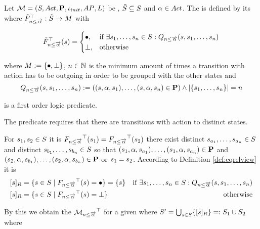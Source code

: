 \documentclass[preview]{standalone}
\begin{document}
\begin{definition}	
	Let ${{{\mathcal{M}}}} = {{({S}, {Act}, {\textbf{P}}, {\iota_{init}}, {AP}, {L})}}$ be \achgphN, ${\tilde{{S}}} \subseteq {S}$ and ${\alpha} \in {Act}$. The \viewN \viewminoutaction is defined by its \grpfctN \gfctminoutaction where ${{\tilde{F}_{{{n}\leq{\overrightarrow{\ensuremath{{\alpha}}}}}}}^{\top}} : {\tilde{{S}}} \to {\ensuremath{{M}}}$ with

	\[
	{{\tilde{F}_{{{n}\leq{\overrightarrow{\ensuremath{{\alpha}}}}}}}^{\top}}({s}) =
	\begin{cases}
			{\bullet},				& \text{if } \exists {s}_1, \dots, {s}_{n} \in {S}:  {Q_{{n}\leq{\overrightarrow{\ensuremath{{\alpha}}}}}({s},{s}_1, \dots, {s}_{{n}})}\\
			{\bot},          	& \text{otherwise}
		\end{cases}
	\]
	
	where ${{M}} := {\{{\bullet}, {\bot}\}}$,
	 ${n} \in {\mathbb{N}}$ is the minimum amount of times a transition with action \action has to be outgoing in order to be grouped with the other states and
	\[
	{Q_{{n}\leq{\overrightarrow{\ensuremath{{\alpha}}}}}({s},{s}_1, \dots, {s}_{{n}})} := (({s}, {\alpha}, {s}_1), \dots, ({s}, {\alpha}, {s}_{n}) \in {\ensuremath{{\textbf{P}}}}) \land |\{{s}_1, \dots, {s}_{n}\}| = {n}
	\]
	
	is a first order logic predicate.
	\label{def:minoutaction}
\end{definition}

The predicate \predminoutact requires that there are transitions with action \action to \numoutact distinct states.

For ${s}_1,{s}_2 \in {S}$ it is ${{F_{{{n}\leq{\overrightarrow{\ensuremath{{\alpha}}}}}}}^{\top}}({s}_1) = {{F_{{{n}\leq{\overrightarrow{\ensuremath{{\alpha}}}}}}}^{\top}}({s}_2)$ \iffN there exist distinct ${s}_{a_1}, \dots, {s}_{a_{n}} \in {S}$ and distinct ${s}_{b_1}, \dots, {s}_{b_{n}} \in {S}$ so that $({s}_1, {\alpha}, {s}_{a_1}), \dots, ({s}_1, {\alpha}, {s}_{a_{n}}) \in {\ensuremath{{\textbf{P}}}}$ and $({s}_2, {\alpha}, {s}_{b_1}), \dots, ({s}_2, {\alpha}, {s}_{b_{n}}) \in {\ensuremath{{\textbf{P}}}}$ or ${s}_1 = {s}_2$. According to Definition \ref{def:eqrelview} it is 
\begin{align*}
	\eqclassv &= \{\state \in \states \mid \gfctminoutaction(\state) = \remelem\} = \{\state\} &\text{if } \exists \state_1, \dots, \state_\numoutact \in \states:  \predminoutact \\ 
	\eqclassv &= \{\state \in \states \mid \gfctminoutaction(\state) = \notppty\} &\text{ otherwise}
\end{align*}

By this we obtain the \viewN ${{{{{\mathcal{M}}}}_{{{n}\leq{\overrightarrow{\ensuremath{{\alpha}}}}}}}^{\top}}$ for a given \chgphN \chgph where ${S}' = \bigcup_{{s} \in {S}} \{{{[{s}]_{{R}}}}\} =: {S}_1 \cup {S}_2$ where 
\end{document}
